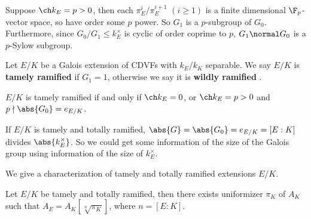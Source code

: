 \documentclass[11pt]{amsart}
\begin{document}
Suppose $\ch k_E = p > 0$, then each $\pi_E^{i} / \pi_E^{i+1}$ $(i \geq 1)$ is a
finite dimensional $\F_p$-vector space, so have order some $p$ power.  So $G_1$
is a $p$-subgroup of $G_0$.  Furthermore, since $G_0/G_1 \leq k_E^{\times}$ is
cyclic of order coprime to $p$,  $G_1 \normal G_0$ is a $p$-Sylow subgroup.

\begin{defn}
    Let $E/K$ be a Galois extension of CDVFs with $k_E/k_K$ separable.  We say
    $E/K$ is {\bf tamely ramified}  if $G_1 = 1$,
    otherwise we say it is {\bf wildly ramified} .
\end{defn}

\begin{remark}
    $E/K$ is tamely ramified if and only if $\ch k_E = 0$, or $\ch k_E = p > 0$
    and $p \nmid \abs{G_0} = e_{E/K}$.
\end{remark}

\begin{remark}
    If $E/K$ is tamely and totally ramified, $\abs{G} = \abs{G_0} = e_{E/K} = [E
    : K]$ divides $\abs{k_E^{\times}}$.  So we could get some information of the
    size of the Galois group using information of the size of $k_E^{\times}$.
\end{remark}

\medskip

We give a characterization of tamely and totally ramified extensions $E/K$.

\begin{prop}
    Let $E/K$ be tamely and totally ramified, then there exists uniformizer
    $\pi_K$ of $A_K$ such that $A_E = A_K[\sqrt[n]{\pi_K}]$, where $n = [E :
    K]$.
\end{prop}
\end{document}
